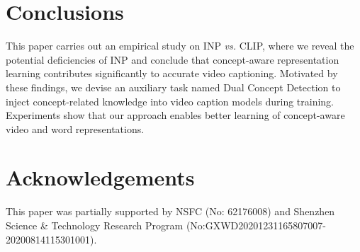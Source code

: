 \documentclass[runningheads]{llncs}
\newcommand\vs{\textit{vs.}}
\begin{document}
\section{Conclusions}
This paper carries out an empirical study on INP \vs{} CLIP, where we reveal the potential deficiencies of INP and conclude that concept-aware representation learning contributes significantly to accurate video captioning. Motivated by these findings, we devise an auxiliary task named Dual Concept Detection to inject concept-related knowledge into video caption models during training. Experiments show that our approach enables better learning of concept-aware video and word representations. 

\section*{Acknowledgements}
\footnotesize This paper was partially supported by NSFC (No: 62176008) and Shenzhen Science \& Technology Research Program (No:GXWD20201231165807007-20200814115301001).





\end{document}
